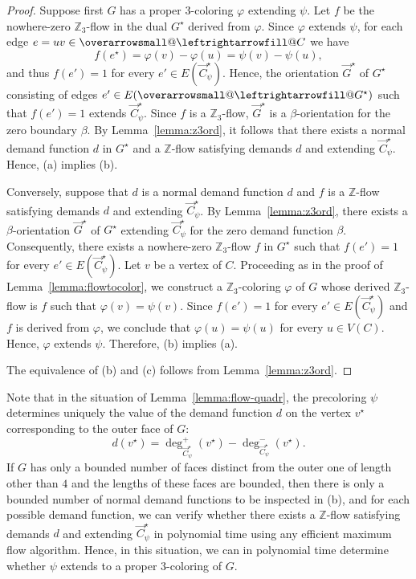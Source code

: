 \documentclass[12pt,twoside,openright,a4paper]{book}
\makeatletter
\newcommand{\ovlr}{\mathpalette{\overarrowsmall@\leftrightarrowfill@}}
\newcommand{\overarrowsmall@}[3]{%
  \vbox{%
    \ialign{%
      ##\crcr
      #1{\smaller@style{#2}}\crcr
      \noalign{\nointerlineskip}%
      $\m@th\hfil#2#3\hfil$\crcr
    }%
  }%
}
\def\smaller@style#1{%
  \ifx#1\displaystyle\scriptstyle\else
    \ifx#1\textstyle\scriptstyle\else
      \scriptscriptstyle
    \fi
  \fi
}
\makeatother
\begin{document}
\begin{proof}
Suppose first $G$ has a proper $3$-coloring $\varphi$ extending $\psi$.  Let $f$ be the nowhere-zero $\mathbb{Z}_3$-flow
in the dual $G^\star$ derived from $\varphi$.  Since $\varphi$ extends $\psi$, for each edge $e=uv\in\ovlr{C}$ we have
$$f(e^\star)=\varphi(v)-\varphi(u)=\psi(v)-\psi(u),$$
and thus $f(e')=1$ for every $e'\in E(\vec{C}^\star_\psi)$.  Hence, the orientation $\vec{G}^\star$ of $G^\star$ consisting of edges $e'\in E(\ovlr{G}^\star)$
such that $f(e')=1$ extends $\vec{C}^\star_\psi$.  Since $f$ is a $\mathbb{Z}_3$-flow, $\vec{G}^\star$ is a $\beta$-orientation for the zero boundary $\beta$.
By Lemma~\ref{lemma:z3ord}, it follows that there exists a normal demand function $d$ in $G^\star$ and a $\mathbb{Z}$-flow satisfying demands $d$
and extending $\vec{C}^\star_\psi$.  Hence, (a) implies (b).

Conversely, suppose that $d$ is a normal demand function $d$ and $f$ is a $\mathbb{Z}$-flow satisfying demands $d$
and extending $\vec{C}^\star_\psi$.  By Lemma~\ref{lemma:z3ord}, there exists a $\beta$-orientation $\vec{G}^\star$ of $G^\star$ extending
$\vec{C}^\star_\psi$ for the zero demand function $\beta$.  Consequently, there exists a nowhere-zero $\mathbb{Z}_3$-flow $f$ in
$G^\star$ such that $f(e')=1$ for every $e'\in E(\vec{C}^\star_\psi)$.  Let $v$ be a vertex of $C$.
Proceeding as in the proof of Lemma~\ref{lemma:flowtocolor}, we construct a $\mathbb{Z}_3$-coloring $\varphi$ of $G$ whose derived
$\mathbb{Z}_3$-flow is $f$ such that $\varphi(v)=\psi(v)$.  Since $f(e')=1$ for every $e'\in E(\vec{C}^\star_\psi)$ and
$f$ is derived from $\varphi$, we conclude that $\varphi(u)=\psi(u)$ for every $u\in V(C)$.  Hence, $\varphi$ extends $\psi$.
Therefore, (b) implies (a).

The equivalence of (b) and (c) follows from Lemma~\ref{lemma:z3ord}.
\end{proof}

Note that in the situation of Lemma~\ref{lemma:flow-quadr}, the precoloring $\psi$ determines uniquely the value of
the demand function $d$ on the vertex $v^\star$ corresponding to the outer face of $G$:
$$d(v^\star)=\deg^+_{\vec{C}^\star_\psi}(v^\star)-\deg^-_{\vec{C}^\star_\psi}(v^\star).$$
If $G$ has only a bounded number of faces distinct from the outer one of length other than $4$ and the lengths of these faces
are bounded, then there is only a bounded number of normal demand functions to be inspected in (b), and for each possible demand
function, we can verify whether there exists a $\mathbb{Z}$-flow satisfying demands $d$ and extending $\vec{C}^\star_\psi$
in polynomial time using any efficient maximum flow algorithm.  Hence, in this situation, we can in polynomial time determine
whether $\psi$ extends to a proper $3$-coloring of $G$.
\end{document}
